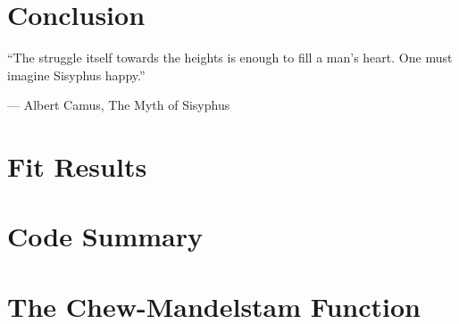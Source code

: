 \documentclass[final]{memoir}
\begin{document}
\chapter{Conclusion}
\epigraph{``The struggle itself towards the heights is enough to fill a man's heart. One must imagine Sisyphus happy.''}{--- \textup{Albert Camus}, The Myth of Sisyphus}


\appendix
{}

\chapter{Fit Results}\label{ch:fit-results}

\chapter{Code Summary}

\chapter{The Chew-Mandelstam Function}


\backmatter
\printbibliography
\newpage
\end{document}
